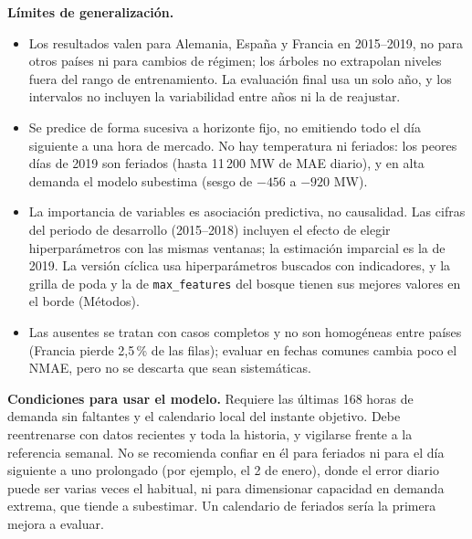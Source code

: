 \textbf{Límites de generalización.}
\begin{itemize}
    \item Los resultados valen para Alemania, España y Francia en 2015--2019, no para otros países ni para cambios de régimen; los árboles no extrapolan niveles fuera del rango de entrenamiento. La evaluación final usa un solo año, y los intervalos no incluyen la variabilidad entre años ni la de reajustar.
    \item Se predice de forma sucesiva a horizonte fijo, no emitiendo todo el día siguiente a una hora de mercado. No hay temperatura ni feriados: los peores días de 2019 son feriados (hasta 11\,200 MW de MAE diario), y en alta demanda el modelo subestima (sesgo de $-456$ a $-920$ MW).
    \item La importancia de variables es asociación predictiva, no causalidad. Las cifras del periodo de desarrollo (2015--2018) incluyen el efecto de elegir hiperparámetros con las mismas ventanas; la estimación imparcial es la de 2019. La versión cíclica usa hiperparámetros buscados con indicadores, y la grilla de poda y la de \texttt{max\_features} del bosque tienen sus mejores valores en el borde (Métodos).
    \item Las ausentes se tratan con casos completos y no son homogéneas entre países (Francia pierde 2,5\,\% de las filas); evaluar en fechas comunes cambia poco el NMAE, pero no se descarta que sean sistemáticas.
\end{itemize}

\textbf{Condiciones para usar el modelo.} Requiere las últimas 168 horas de demanda sin faltantes y el calendario local del instante objetivo. Debe reentrenarse con datos recientes y toda la historia, y vigilarse frente a la referencia semanal. No se recomienda confiar en él para feriados ni para el día siguiente a uno prolongado (por ejemplo, el 2 de enero), donde el error diario puede ser varias veces el habitual, ni para dimensionar capacidad en demanda extrema, que tiende a subestimar. Un calendario de feriados sería la primera mejora a evaluar.
